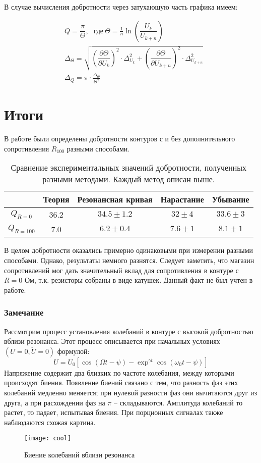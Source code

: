 \documentclass{lab}
\begin{document}
В случае вычисления добротности через затухающую часть графика имеем:

\begin{equation}
\begin{aligned}
	&Q = \dfrac{\pi}{\Theta} , ~~~ где \ \Theta = \frac{1}{n} \ln (\dfrac{U_k}{U_{k+n}})\\
	&\Delta_{\Theta} = \sqrt{\left( \dfrac{\partial {\Theta}}{\partial U_k} \right)^2 \cdot \Delta_{U_k}^2 +
	\left( \dfrac{\partial {\Theta}}{\partial U_{k+n}} \right)^2 \cdot \Delta_{U_{k+n}}^2}\\
	&\Delta_Q = \pi \cdot \frac{\Delta_{\Theta}}{\Theta^2}
\end{aligned}
\end{equation}

\section*{Итоги}

В работе были определены добротности контуров с и без дополнительного сопротивления
$ R_{100} $ разными способами.

\begin{table}[H]
	\centering
	\renewcommand{\arraystretch}{1.3}
	\begin{tabular}{|c|c|c|c|c|}
		\hline
		& Теория & Резонансная кривая & Нарастание & Убывание     \\ \hline
		$Q_{R=0}$	& 36.2	& $34.5 \pm 1.2$	& $32 \pm 4$	& $33.6 \pm 3$ \\ \hline
		$Q_{R=100}$	& 7.0	& $6.2 \pm 0.4$		& $7.6 \pm 1$	& $8.1 \pm 1$  \\ \hline
	\end{tabular}
	\caption{\footnotesize Сравнение экспериментальных значений добротности, полученных разными методами. Каждый метод описан выше.}
	\label{tab4}
	\renewcommand{\arraystretch}{1}
\end{table}

В целом добротности оказались примерно одинаковыми при измерении разными способами. Однако,
результаты немного разнятся. Следует заметить, что магазин сопротивлений мог дать
значительный вклад для сопротивления в контуре с $ R = 0 $ Ом, т.к. резисторы собраны в
виде катушек. Данный факт не был учтен в работе.

\subsubsection*{Замечание}
Рассмотрим процесс установления колебаний в контуре с высокой добротностью вблизи резонанса.
Этот процесс описывается при начальных условиях $ (U = 0, \ddot{U} = 0) $ формулой:
$$ U = U_0[\cos(\Omega t - \psi) - \exp^{\gamma t} \cos (\omega_0 t - \psi)] $$
Напряжение содержит два близких по частоте колебания, между которыми происходят биения.
Появление биений связано с тем, что разность фаз этих колебаний медленно меняется; при
нулевой разности фаз они вычитаются друг из друга, а при расхождении фаз на $ \pi $ --
складываются. Амплитуда колебаний то растет, то падает, испытывая биения. При порционных
сигналах также наблюдаются схожая картина.

\begin{figure}[!h]
	\centering
	\texttt{[image: cool]}
	\caption{\footnotesize Биение колебаний вблизи резонанса}
\end{figure}
\end{document}
